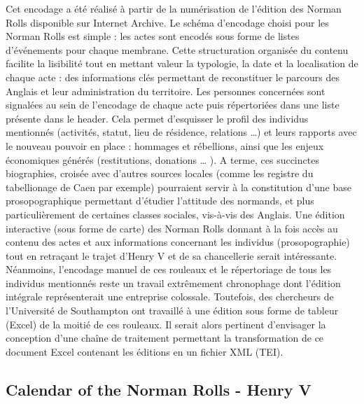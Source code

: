 \documentclass[a4paper,12pt,twoside]{book}
\begin{document}
            \medskip
        
            Cet encodage a été réalisé à partir de la numérisation de l'édition des Norman Rolls disponible sur Internet Archive.
            Le schéma d’encodage choisi pour les Norman Rolls est simple : les actes sont encodés sous forme de listes d’événements pour chaque membrane. 
            Cette structuration organisée du contenu facilite la lisibilité tout en mettant valeur la typologie, la date et la localisation de chaque acte : des informations clés permettant de reconstituer le parcours des Anglais et leur administration du territoire. 
            Les personnes concernées sont signalées au sein de l’encodage de chaque acte puis répertoriées dans une liste présente dans le header. 
            Cela permet d’esquisser le profil des individus mentionnés (activités, statut, lieu de résidence, relations …) et leurs rapports avec le nouveau pouvoir en place : hommages et rébellions, ainsi que les enjeux économiques générés (restitutions, donations … ). 
            A terme, ces succinctes biographies, croisée avec d’autres sources locales (comme les registre du tabellionage de Caen par exemple) pourraient servir à la constitution d’une base prosopographique permettant d’étudier l’attitude des normands, et plus particulièrement de certaines classes sociales, vis-à-vis des Anglais. 
            Une édition interactive (sous forme de carte) des Norman Rolls donnant à la fois accès au contenu des actes et aux informations concernant les individus (prosopographie) tout en retraçant le trajet d’Henry V et de sa chancellerie serait intéressante. 
            Néanmoins, l’encodage manuel de ces rouleaux et le répertoriage de tous les individus mentionnés reste un travail extrêmement chronophage dont l’édition intégrale représenterait une entreprise colossale.
            Toutefois, des chercheurs de l'Université de Southampton ont travaillé à une édition sous forme de tableur (Excel) de la moitié de ces rouleaux. Il serait alors pertinent d'envisager la conception d'une chaîne de traitement permettant la transformation de ce document Excel contenant les éditions en un fichier XML (TEI).
         
        
            \bigskip
        
            \begin{Large}
    
            
            \section{Calendar of the Norman Rolls - Henry V}
            \end{Large}
        
\end{document}
